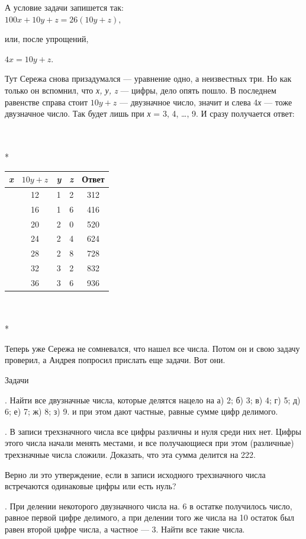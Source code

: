 \qquad 
\begin{minipage}[bs]{0.48\textwidth}
\begin{minipage}[bs]{\textwidth}
\raggedright{А условие задачи запишется так:\\}
{\centering$100x + 10y + z = 26(10y + z),$\\}
\raggedright{или, после упрощений,\\}
{\centering$4x = 10y + z$.

}
Тут Сережа снова призадумался — уравнение одно, а неизвестных три. Но как только он вспомнил, что \textit{х, у, z} — цифры, дело опять пошло. В последнем равенстве справа стоит $10y + z$ — двузначное число, значит и слева 4\textit{х} — тоже двузначное число. Так будет лишь при \textit{х} = 3, 4, \ldots, 9. И сразу получается ответ:
\end{minipage}\\
\newline \\*
\renewcommand{\arraystretch}{0.8}
\renewcommand{\tabcolsep}{0.5cm}
{\small\begin{tabular*}{\textwidth}{@{\extracolsep{\fill}}c|c|c|c|c}
 \hline
 \rule{0cm}{0.65cm}
 \quad\textit{x} & $10y+z$ & \textit{y} & \textit{z} & Ответ\\ [0.3cm]
 \hline
 \rule{0cm}{0.65cm}
 \quad3 & 12 & 1 & 2 & 312 \\
 \quad4 & 16 & 1 & 6 & 416 \\
 \quad5 & 20 & 2 & 0 & 520 \\
 \quad6 & 24 & 2 & 4 & 624 \\
 \quad7 & 28 & 2 & 8 & 728 \\
 \quad8 & 32 & 3 & 2 & 832 \\
 \quad9 & 36 & 3 & 6 & 936 \\ [0.3cm]
 \hline
\end{tabular*}}\\
\newline \\*
\begin{minipage}[bs]{\textwidth}
\qquad Теперь уже Сережа не сомневался, что нашел все числа. Потом он и свою задачу проверил, а Андрея попросил прислать еще задачи. Вот они.

{\small\qquad Задачи

. Найти все двузначные числа, которые делятся нацело на а) 2; б) 3; в) 4; г) 5; д) 6; е) 7; ж) 8; з) 9. и при этом дают частные, равные сумме цифр делимого.

. В записи трехзначного числа все цифры различны и нуля среди них нет. Цифры этого числа начали менять местами, и все получающиеся при этом (различные) трехзначные числа сложили. Доказать, что эта сумма делится на 222.

\qquad Верно ли это утверждение, если в записи исходного трехзначного числа встречаются одинаковые цифры или есть нуль?

. При делении некоторого двузначного числа на. 6 в остатке получилось число, равное первой цифре делимого, а при делении того же числа на 10 остаток был равен второй цифре числа, а частное — 3. Найти все такие числа.}
\end{minipage}
\end{minipage}

